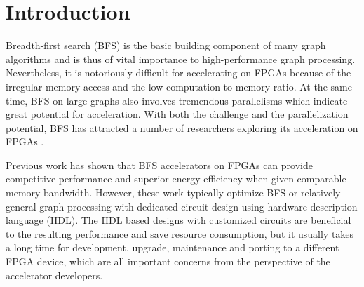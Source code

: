 \section{Introduction} \label{sec:intro}

Breadth-first search (BFS) is the basic building component of many graph algorithms 
and is thus of vital importance to high-performance graph processing. Nevertheless, 
it is notoriously difficult for accelerating on FPGAs because of the 
irregular memory access and the low 
computation-to-memory ratio. At the same time, BFS on large graphs also involves 
tremendous parallelisms which indicate great potential for acceleration. 
With both the challenge and the parallelization potential, 
BFS has attracted a number of researchers exploring its acceleration on FPGAs 
\cite{attia2014cygraph, betkaoui2012reconfigurable, Dai2017foregraph, Ma2017fpga,
umuroglu2015hybrid, oguntebi2016graphops, engelhardt2016gravf, zhou2016high}. 

Previous work has shown that BFS accelerators on FPGAs can provide competitive  
performance and superior energy efficiency when given comparable memory bandwidth. 
However, these work typically optimize BFS or relatively general graph processing 
with dedicated circuit design using hardware description language (HDL). The HDL 
based designs with customized circuits are beneficial to the resulting performance 
and save resource consumption, but it usually takes a long time for development, 
upgrade, maintenance and porting to a different FPGA device, which are all 
important concerns from the perspective of the accelerator developers. 


